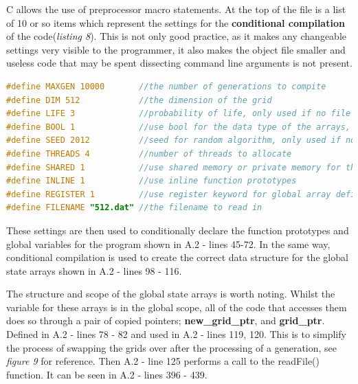 \documentclass[11pt]{article} %
\begin{document}
C allows the use of preprocessor macro statements. At the top of the file is a list of 10 or so items which represent the settings for the {\bf conditional compilation} of the code({\it listing 8}). This is not only good practice, as it makes any changeable settings very visible to the programmer, it also makes the object file smaller and useless code that may be spent dissecting command line arguments is not present. 
\begin{lstlisting}[language=C, caption={OpenMP program settings in file}]
#define MAXGEN 10000       //the number of generations to compite
#define DIM 512            //the dimension of the grid 
#define LIFE 3             //probability of life, only used if no file read
#define BOOL 1             //use bool for the data type of the arrays, else int
#define SEED 2012          //seed for random algorithm, only used if no file read
#define THREADS 4          //number of threads to allocate
#define SHARED 1           //use shared memory or private memory for threads
#define INLINE 1           //use inline function prototypes
#define REGISTER 1         //use register keyword for global array definition
#define FILENAME "512.dat" //the filename to read in
\end{lstlisting}
These settings are then used to conditionally declare the function prototypes and global variables for the program shown in A.2 - lines 45-72. In the same way, conditional compilation is used to create the correct data structure for the global state arrays shown in A.2 - lines 98 - 116.

The structure and scope of the global state arrays is worth noting. Whilst the variable for these arrays is in the global scope, all of the code that accesses them does so through a pair of copied pointers; {\bf new\_grid\_ptr}, and {\bf grid\_ptr}. Defined in A.2 - lines 78 - 82 and used in A.2 - lines 119, 120. This is to simplify the process of swapping the grids over after the processing of a generation, see {\it figure 9} for reference. Then A.2 - line 125 performs a call to the readFile() function. It can be seen in A.2 - lines 396 - 439. 
\end{document}

